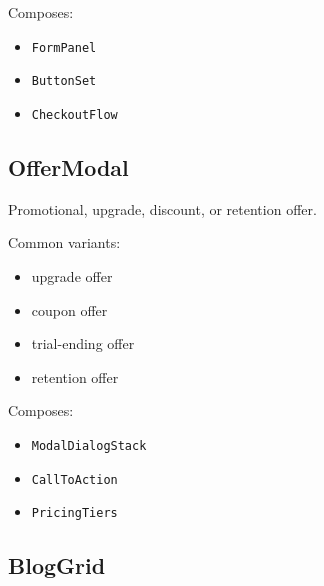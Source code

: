 Composes:

\begin{itemize}
\tightlist
\item
  \texttt{F\allowbreak{}o\allowbreak{}r\allowbreak{}m\allowbreak{}P\allowbreak{}a\allowbreak{}n\allowbreak{}e\allowbreak{}l}
\item
  \texttt{B\allowbreak{}u\allowbreak{}t\allowbreak{}t\allowbreak{}o\allowbreak{}n\allowbreak{}S\allowbreak{}e\allowbreak{}t}
\item
  \texttt{C\allowbreak{}h\allowbreak{}e\allowbreak{}c\allowbreak{}k\allowbreak{}o\allowbreak{}u\allowbreak{}t\allowbreak{}F\allowbreak{}l\allowbreak{}o\allowbreak{}w}
\end{itemize}

\subsection{OfferModal}\label{record-128-offermodal}

Promotional, upgrade, discount, or retention offer.

Common variants:

\begin{itemize}
\tightlist
\item
  upgrade offer
\item
  coupon offer
\item
  trial-ending offer
\item
  retention offer
\end{itemize}

Composes:

\begin{itemize}
\tightlist
\item
  \texttt{M\allowbreak{}o\allowbreak{}d\allowbreak{}a\allowbreak{}l\allowbreak{}D\allowbreak{}i\allowbreak{}a\allowbreak{}l\allowbreak{}o\allowbreak{}g\allowbreak{}S\allowbreak{}t\allowbreak{}a\allowbreak{}c\allowbreak{}k}
\item
  \texttt{C\allowbreak{}a\allowbreak{}l\allowbreak{}l\allowbreak{}T\allowbreak{}o\allowbreak{}A\allowbreak{}c\allowbreak{}t\allowbreak{}i\allowbreak{}o\allowbreak{}n}
\item
  \texttt{P\allowbreak{}r\allowbreak{}i\allowbreak{}c\allowbreak{}i\allowbreak{}n\allowbreak{}g\allowbreak{}T\allowbreak{}i\allowbreak{}e\allowbreak{}r\allowbreak{}s}
\end{itemize}

\subsection{BlogGrid}\label{record-128-bloggrid}

